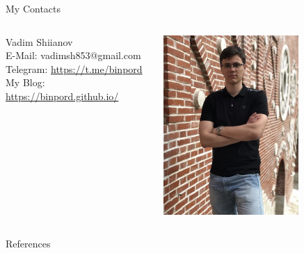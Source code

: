 \documentclass{beamer}
\begin{document}
\begin{frame}{My Contacts}
    \begin{columns}
        \begin{column}{0.5\textwidth}
            Vadim Shiianov \\
            E-Mail: vadimsh853@gmail.com \\
            Telegram: \url{https://t.me/binpord} \\
            My Blog: \url{https://binpord.github.io/}
        \end{column}
        \begin{column}{0.5\textwidth}
            \begin{center}
                \includegraphics[width=0.7\textwidth]{../images/me.jpg}
            \end{center}
        \end{column}
    \end{columns}
\end{frame}

\begin{frame}[allowframebreaks]{References}
    
    
\end{frame}
\end{document}
